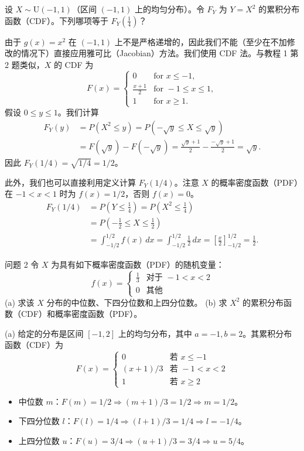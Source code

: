 \begin{questions}
\question
设 $X \sim \text{U}(-1, 1)$（区间 $(-1, 1)$ 上的均匀分布）。令 $F_Y$ 为 $Y = X^2$ 的累积分布函数（CDF）。下列哪项等于 $F_Y \left( \frac{1}{4} \right)$？

\begin{solution}
由于 $g(x) = x^2$ 在 $(-1, 1)$ 上不是严格递增的，因此我们不能（至少在不加修改的情况下）直接应用雅可比（Jacobian）方法。我们使用 CDF 法。与教程 1 第 2 题类似，$X$ 的 CDF 为
\[
F(x) = \begin{cases} 0 & \text{for } x \le -1, \\ \frac{x+1}{2} & \text{for } -1 \le x \le 1, \\ 1 & \text{for } x \ge 1. \end{cases}
\]
假设 $0 \le y \le 1$。我们计算
\begin{align*}
F_Y(y) &= P(X^2 \le y) = P(-\sqrt{y} \le X \le \sqrt{y}) \\
&= F(\sqrt{y}) - F(-\sqrt{y}) = \frac{\sqrt{y} + 1}{2} - \frac{-\sqrt{y} + 1}{2} = \sqrt{y}.
\end{align*}
因此 $F_Y(1/4) = \sqrt{1/4} = 1/2$。

此外，我们也可以直接利用定义计算 $F_Y(1/4)$。注意 $X$ 的概率密度函数（PDF）在 $-1 < x < 1$ 时为 $f(x) = 1/2$，否则 $f(x) = 0$。
\begin{align*}
F_Y(1/4) &= P\left( Y \le \frac{1}{4} \right) = P\left( X^2 \le \frac{1}{4} \right) \\
&= P\left( -\frac{1}{2} \le X \le \frac{1}{2} \right) \\
&= \int_{-1/2}^{1/2} f(x) \, dx = \int_{-1/2}^{1/2} \frac{1}{2} \, dx = \left[ \frac{x}{2} \right]_{-1/2}^{1/2} = \frac{1}{2}.
\end{align*}
\end{solution}

\question 问题 2 令 $X$ 为具有如下概率密度函数（PDF）的随机变量：
\[
f(x) = \begin{cases} \frac{1}{3} & \text{对于 } -1 < x < 2 \\ 0 & \text{其他} \end{cases}
\]
(a) 求该 $X$ 分布的中位数、下四分位数和上四分位数。
(b) 求 $X^2$ 的累积分布函数（CDF）和概率密度函数（PDF）。

\begin{solution}
(a) 给定的分布是区间 $[-1, 2]$ 上的均匀分布，其中 $a = -1, b = 2$。其累积分布函数（CDF）为
\[
F(x) = \begin{cases} 0 & \text{若 } x \le -1 \\ (x + 1)/3 & \text{若 } -1 < x < 2 \\ 1 & \text{若 } x \ge 2 \end{cases}
\]
\begin{itemize}
    \item 中位数 $m$：$F(m) = 1/2 \Rightarrow (m + 1)/3 = 1/2 \Rightarrow m = 1/2$。
    \item 下四分位数 $l$：$F(l) = 1/4 \Rightarrow (l + 1)/3 = 1/4 \Rightarrow l = -1/4$。
    \item 上四分位数 $u$：$F(u) = 3/4 \Rightarrow (u + 1)/3 = 3/4 \Rightarrow u = 5/4$。
\end{itemize}


\end{solution}
\end{questions}

